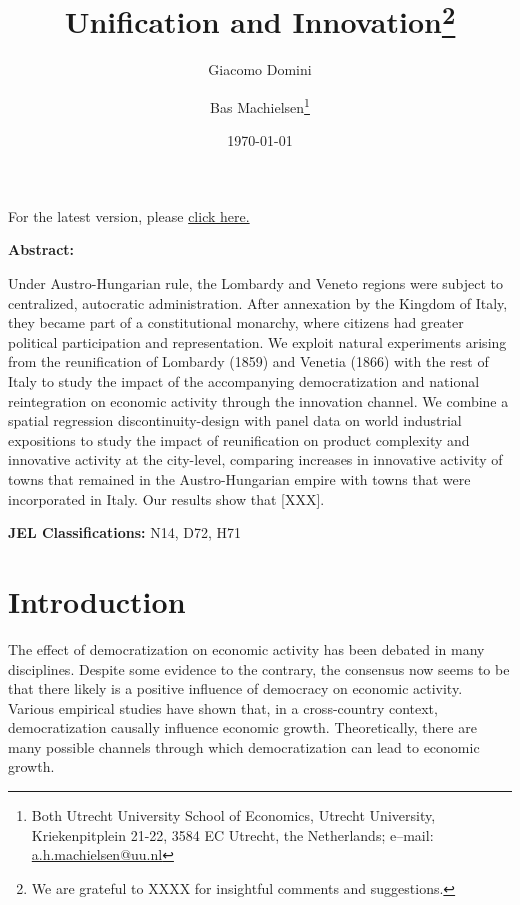 

\title{Unification and Innovation\footnote{We are grateful to XXXX for insightful comments and suggestions.}}
\author{Giacomo Domini \and Bas Machielsen\footnote{Both Utrecht University School of Economics, Utrecht University, Kriekenpitplein 21-22, 3584 EC Utrecht, the Netherlands; e--mail: \href{mailto:a.h.machielsen@uu.nl}{a.h.machielsen@uu.nl}}}
\date{\today}



\maketitle

\begin{center}
    For the latest version, please \href{http://link.com/paper.pdf}{click here.}
\end{center}

\begin{center} \textbf{Abstract:} \end{center}

\noindent Under Austro-Hungarian rule, the Lombardy and Veneto regions were subject to centralized, autocratic administration. After annexation by the Kingdom of Italy, they became part of a constitutional monarchy, where citizens had greater political participation and representation. We exploit natural experiments arising from the reunification of Lombardy (1859) and Venetia (1866) with the rest of Italy to study the impact of the accompanying democratization and national reintegration on economic activity through the innovation channel. We combine a spatial regression discontinuity-design with panel data on world industrial expositions to study the impact of reunification on product complexity and innovative activity at the city-level, comparing increases in innovative activity of towns that remained in the Austro-Hungarian empire with towns that were incorporated in Italy. Our results show that [XXX]. 

\textbf{JEL Classifications:} N14, D72, H71

\clearpage

\section{Introduction}

The effect of democratization on economic activity has been debated in many disciplines. Despite some evidence to the contrary, the consensus now seems to be that there likely is a positive influence of democracy on economic activity. Various empirical studies have shown that, in a cross-country context, democratization causally influence economic growth. Theoretically, there are many possible channels through which democratization can lead to economic growth. %

